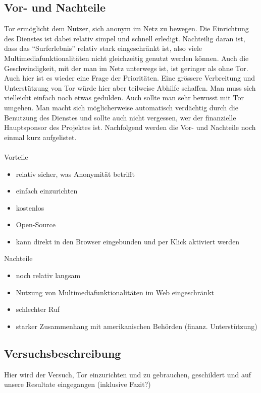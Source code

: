 \subsection{Vor- und Nachteile}
Tor ermöglicht dem Nutzer, sich anonym im Netz zu bewegen. Die Einrichtung des Dienstes ist dabei relativ simpel und schnell erledigt. Nachteilig daran ist, dass das ``Surferlebnis'' relativ stark eingeschränkt ist, also viele Multimediafunktionalitäten nicht gleichzeitig genutzt werden können. Auch die Geschwindigkeit, mit der man im Netz unterwegs ist, ist geringer als ohne Tor. Auch hier ist es wieder eine Frage der Prioritäten. Eine grössere Verbreitung und Unterstützung von Tor würde hier aber teilweise Abhilfe schaffen. Man muss sich vielleicht einfach noch etwas gedulden. Auch sollte man sehr bewusst mit Tor umgehen. Man macht sich möglicherweise automatisch verdächtig durch die Benutzung des Dienstes und sollte auch nicht vergessen, wer der finanzielle Hauptsponsor des Projektes ist.
Nachfolgend werden die Vor- und Nachteile noch einmal kurz aufgelistet.
\\
\\
Vorteile
\begin{itemize}
\item relativ sicher, was Anonymität betrifft
\item einfach einzurichten
\item kostenlos
\item Open-Source
\item kann direkt in den Browser eingebunden und per Klick aktiviert werden
\end{itemize}

Nachteile
\begin{itemize}
\item noch relativ langsam
\item Nutzung von Multimediafunktionalitäten im Web eingeschränkt
\item schlechter Ruf
\item starker Zusammenhang mit amerikanischen Behörden (finanz. Unterstützung)
\end{itemize}

\subsection{Versuchsbeschreibung}
Hier wird der Versuch, Tor einzurichten und zu gebrauchen, geschildert und auf unsere Resultate eingegangen (inklusive Fazit?)


